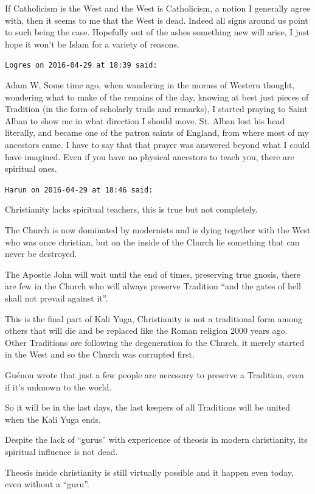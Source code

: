 \begin{footnotesize}
\begin{sffamily}
If Catholicism is the West and the West is Catholicism, a notion I generally agree with, then it seems to me that the West is dead. Indeed all signs around us point to such being the case. Hopefully out of the ashes something new will arise, I just hope it won't be Islam for a variety of reasons.

\hfill

\texttt{Logres on 2016-04-29 at 18:39 said:}

Adam W, Some time ago, when wandering in the morass of Western thought, wondering what to make of the remains of the day, knowing at best just pieces of Tradition (in the form of scholarly trails and remarks), I started praying to Saint Alban to show me in what direction I should move. St. Alban lost his head literally, and became one of the patron saints of England, from where most of my ancestors came. I have to say that that prayer was answered beyond what I could have imagined. Even if you have no physical ancestors to teach you, there are spiritual ones.

\hfill

\texttt{Harun on 2016-04-29 at 18:46 said:}

Christianity lacks spiritual teachers, this is true but not completely.

The Church is now dominated by modernists and is dying together with the West who was once christian, but on the inside of the Church lie something that can never be destroyed.

The Apostle John will wait until the end of times, preserving true gnosis, there are few in the Church who will always preserve Tradition ``and the gates of hell shall not prevail against it''.

This is the final part of Kali Yuga, Christianity is not a traditional form among others that will die and be replaced like the Roman religion 2000 years ago. Other Traditions are following the degeneration fo the Church, it merely started in the West and so the Church was corrupted first.

Guénon wrote that just a few people are necessary to preserve a Tradition, even if it's unknown to the world.

So it will be in the last days, the last keepers of all Traditions will be united when the Kali Yuga ends.

Despite the lack of ``gurus'' with expericence of theosis in modern christianity, its spiritual influence is not dead.

Theosis inside christianity is still virtually possible and it happen even today, even without a ``guru''.


\end{sffamily}
\end{footnotesize}

